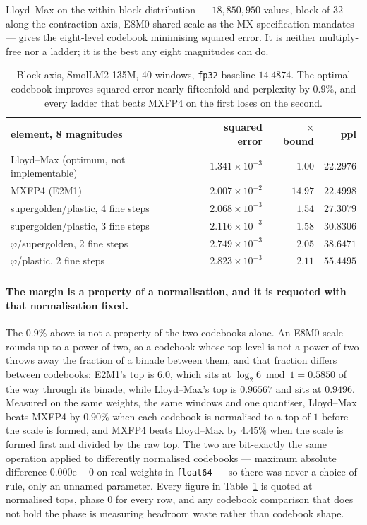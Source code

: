 \documentclass[11pt]{article}
\theoremstyle{definition}
\begin{document}
Lloyd--Max on the within-block distribution --- $18{,}850{,}950$ values, block of
$32$ along the contraction axis, E8M0 shared scale as the MX specification
mandates --- gives the eight-level codebook minimising squared error. It is
neither multiply-free nor a ladder; it is the best any eight magnitudes can do.

\begin{table}[t]\centering
\caption{Block axis, SmolLM2-135M, 40 windows, \texttt{fp32} baseline $14.4874$.
The optimal codebook improves squared error nearly fifteenfold and perplexity by
$0.9\%$, and every ladder that beats MXFP4 on the first loses on the second.}
\label{tab:blockbound}
\begin{tabular}{lrrr}
\toprule
element, 8 magnitudes & squared error & $\times$ bound & ppl \\
\midrule
Lloyd--Max (optimum, not implementable) & $1.341\!\times\!10^{-3}$ & $1.00$ & $\mathbf{22.2976}$ \\
MXFP4 (E2M1)                            & $2.007\!\times\!10^{-2}$ & $14.97$ & $\mathbf{22.4998}$ \\
supergolden/plastic, 4 fine steps       & $2.068\!\times\!10^{-3}$ & $1.54$ & $27.3079$ \\
supergolden/plastic, 3 fine steps       & $2.116\!\times\!10^{-3}$ & $1.58$ & $30.8306$ \\
$\varphi$/supergolden, 2 fine steps     & $2.749\!\times\!10^{-3}$ & $2.05$ & $38.6471$ \\
$\varphi$/plastic, 2 fine steps         & $2.823\!\times\!10^{-3}$ & $2.11$ & $55.4495$ \\
\bottomrule
\end{tabular}
\end{table}

\paragraph{The margin is a property of a normalisation, and it is requoted with
that normalisation fixed.} The $0.9\%$ above is not a property of the two
codebooks alone. An E8M0 scale rounds up to a power of two, so a codebook whose
top level is not a power of two throws away the fraction of a binade between
them, and that fraction differs between codebooks: E2M1's top is $6.0$, which
sits at $\log_2 6 \bmod 1 = 0.5850$ of the way through its binade, while
Lloyd--Max's top is $0.96567$ and sits at $0.9496$. Measured on the same weights,
the same windows and one quantiser, Lloyd--Max beats MXFP4 by $0.90\%$ when each
codebook is normalised to a top of $1$ before the scale is formed, and MXFP4
beats Lloyd--Max by $4.45\%$ when the scale is formed first and divided by the
raw top. The two are bit-exactly the same operation applied to differently
normalised codebooks --- maximum absolute difference $0.000\mathrm{e}{+}0$ on
real weights in \texttt{float64} --- so there was never a choice of rule, only an
unnamed parameter. Every figure in Table~\ref{tab:blockbound} is quoted at
normalised tops, phase $0$ for every row, and any codebook comparison that does
not hold the phase is measuring headroom waste rather than codebook shape.
\end{document}
